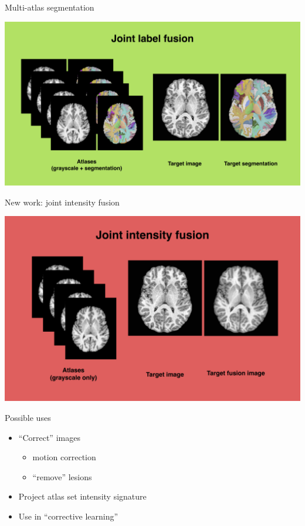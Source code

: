 \documentclass[ignorenonframetext,]{beamer}
\begin{document}
\begin{frame}{Multi-atlas segmentation}

\includegraphics{./tools/jointfusion/figures/jointLabelFusion.png}

\end{frame}

\begin{frame}{New work: joint intensity fusion}

\includegraphics{./tools/jointfusion/figures/jointIntensityFusion.png}

\end{frame}

\begin{frame}{Possible uses}

\begin{itemize}
\item
  ``Correct'' images

  \begin{itemize}
  \item
    motion correction
  \item
    ``remove'' lesions
  \end{itemize}
\item
  Project atlas set intensity signature
\item
  Use in ``corrective learning''
\end{itemize}

\end{frame}
\end{document}
